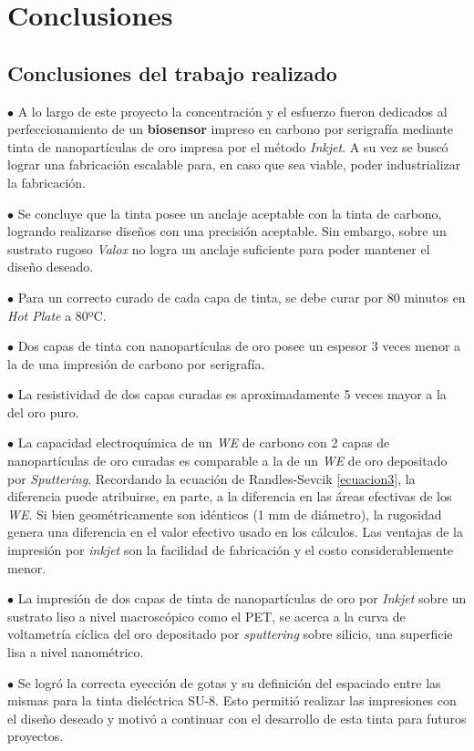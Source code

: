 \chapter{Conclusiones}

\section{Conclusiones del trabajo realizado}
$\bullet$ A lo largo de este proyecto la concentración y el esfuerzo fueron dedicados al perfeccionamiento de un \textbf{biosensor} impreso en carbono por serigrafía mediante tinta de nanopartículas de oro impresa por el método \textit{Inkjet}. A su vez se buscó lograr una fabricación escalable para, en caso que sea viable, poder industrializar la fabricación.


$\bullet$ Se concluye que la tinta posee un anclaje aceptable con la tinta de carbono, logrando realizarse diseños con una precisión aceptable. Sin embargo, sobre un sustrato rugoso \textit{Valox} no logra un anclaje suficiente para poder mantener el diseño deseado.

$\bullet$ Para un correcto curado de cada capa de tinta, se debe curar por 80 minutos en \textit{Hot Plate} a 80ºC.

$\bullet$ Dos capas de tinta con nanopartículas de oro posee un espesor 3 veces menor a la de una impresión de carbono por serigrafía.

$\bullet$ La resistividad de dos capas curadas es aproximadamente 5 veces mayor a la del oro puro.

$\bullet$ La capacidad electroquímica de un \emph{WE} de carbono con 2 capas de nanopartículas de oro curadas es comparable a la de un \emph{WE} de oro depositado por \textit{Sputtering}. Recordando la ecuación de Randles-Sevcik \ref{ecuacion3}, la diferencia puede atribuirse, en parte, a la diferencia en las áreas efectivas de los \emph{WE}. Si bien geométricamente son idénticos (1 mm de diámetro), la rugosidad genera una diferencia en el valor efectivo usado en los cálculos. Las ventajas de la impresión por \textit{inkjet} son la facilidad de fabricación y el costo considerablemente menor. 

$\bullet$ La impresión de dos capas de tinta de nanopartículas de oro por \textit{Inkjet} sobre un sustrato liso a nivel macroscópico como el PET, se acerca a la curva de voltametría cíclica del oro depositado por \textit{sputtering} sobre silicio, una superficie lisa a nivel nanométrico.

$\bullet$ Se logró la correcta eyección de gotas y su definición del espaciado entre las mismas para la tinta dieléctrica SU-8. Esto permitió realizar las impresiones con el diseño deseado y motivó a continuar con el desarrollo de esta tinta para futuros proyectos.

